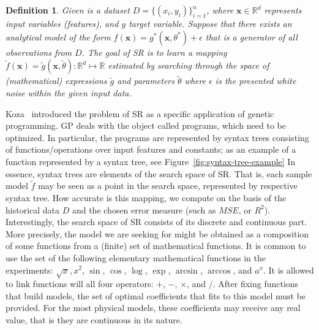 \documentclass[a4paper,12pt]{elsarticle}
\newtheorem{definition}{Definition}
\begin{document}
	\begin{definition}
		Given is a dataset $D = \{(x_i, y_i)\}_{i=1}^n$, where $\textbf{x} \in \mathbb{R}^d$ represents input variables (features), and $y$ target variable. Suppose that there exists an analytical model of the form $f(\textbf{x})= g^*(\textbf{x}, \theta^*) + \epsilon $ that is a generator of all observations from $D$.  
		The goal of SR is to learn a mapping $\tilde{f}(\textbf{x})=  \tilde{g}(\textbf{x}, \tilde{\theta})  \colon \mathbb{R}^d \mapsto \mathbb{R}$  estimated by searching through the space of (mathematical) expressions  $\tilde{g}$ and parameters $\tilde{\theta}$ where  $\epsilon$ is the presented  white noise within the given input data. 
		
	\end{definition}
	
	Koza~\cite{koza1994genetic} introduced the problem of SR as a specific application of genetic programming. GP deals with the object called programs, which need to be optimized. In particular, the programs are represented by syntax trees consisting of functions/operations over input features and constants; as an example of a function represented by a syntax tree, see Figure~\ref{fig:syntax-tree-example} In essence, syntax trees are elements of the search space of SR. That is, each sample model $\tilde{f}$ may be seen as a point in the search space, represented by respective syntax tree. How accurate is this mapping, we compute on the basis of the historical data $D$ and the chosen error   measure (such as $MSE$, or $R^2$). Interestingly, the search space of SR consists of its discrete and continuous part. More precisely, the model we are seeking for might be obtained as a composition of some functions from a (finite) set of mathematical functions. It is common to use the set of the following elementary mathematical functions in the experiments: $\sqrt{x}, x^2 $, $\sin$, $\cos$, $\log$, $\exp$, $\arcsin$, $\arccos$, and $a^x$. It is allowed to link functions will all four operators: $+$, $-$, $\times$, and $/$. After fixing functions that build models, the set of optimal coefficients that  fits to this model must be provided. For the most physical models, these coefficients may receive any real value, that is they are continuous in its nature. 
	
\end{document}
